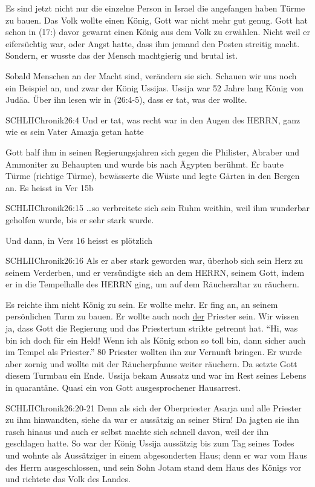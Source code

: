 \documentclass[fontsize=16pt]{mybib}
\begin{document}
\begin{otsblock}

    Es sind jetzt nicht nur die einzelne Person in Israel die angefangen haben Türme zu bauen. Das Volk wollte einen König, Gott war nicht mehr gut genug. Gott hat schon in (17:) davor gewarnt einen König aus dem Volk zu erwählen. Nicht weil er eifersüchtig war, oder Angst hatte, dass ihm jemand den Posten streitig macht. Sondern, er wusste das der Mensch machtgierig und brutal ist.
    
    Sobald Menschen an der Macht sind, verändern sie sich. Schauen wir uns noch ein Beispiel an, und zwar der König Ussijas. Ussija war 52 Jahre lang König von Judäa. Über ihn lesen wir in (26:4-5), dass er tat, was der \herr{} wollte. 
    \begin{bibelbox}{SCHL}{IIChronik}{26:4}
        Und er tat, was recht war in den Augen des HERRN, ganz wie es sein Vater Amazja getan hatte
    \end{bibelbox} 
    Gott half ihm in seinen Regierungsjahren sich gegen die Philister, Abraber und Ammoniter zu Behaupten und wurde bis nach Ägypten berühmt. Er baute Türme (richtige Türme), bewässerte die Wüste und legte Gärten in den Bergen an. Es heisst in Ver 15b
    \begin{bibelbox}{SCHL}{IIChronik}{26:15}
        \dots so verbreitete sich sein Ruhm weithin, weil ihm wunderbar geholfen wurde, bis er sehr stark wurde.
    \end{bibelbox} 

    Und dann, in Vers 16 heisst es plötzlich
    \begin{bibelbox}{SCHL}{IIChronik}{26:16}
        Als er aber stark geworden war, überhob sich sein Herz zu seinem Verderben, und er versündigte sich an dem HERRN, seinem Gott, indem er in die Tempelhalle des HERRN ging, um auf dem Räucheraltar zu räuchern.
    \end{bibelbox} 
    Es reichte ihm nicht König zu sein. Er wollte mehr. Er fing an, an seinem persönlichen Turm zu bauen. Er wollte auch noch \underline{der} Priester sein. Wir wissen ja, dass Gott die Regierung und das Priestertum strikte getrennt hat. 
    \enquote{Hi, was bin ich doch für ein Held! Wenn ich als König schon so toll bin, dann sicher auch im Tempel als Priester.} 80 Priester wollten ihn zur Vernunft bringen. Er wurde aber zornig und wollte mit der Räucherpfanne weiter räuchern. Da setzte Gott diesem Turmbau ein Ende. Ussija bekam Aussatz und war im Rest seines Lebens in quarantäne. Quasi ein von Gott ausgesprochener Hausarrest.
    \begin{bibelbox}{SCHL}{IIChronik}{26:20-21}
        Denn als sich der Oberpriester Asarja und alle Priester zu ihm hinwandten, siehe da war er aussätzig an seiner Stirn! Da jagten sie ihn rasch hinaus und auch er selbst machte sich schnell davon, weil der \herr{} ihn geschlagen hatte.
        So war der König Ussija aussätzig bis zum Tag seines Todes und wohnte als Aussätziger in einem abgesonderten Haus; denn er war vom Haus des Herrn ausgeschlossen, und sein Sohn Jotam stand dem Haus des Königs vor und richtete das Volk des Landes.
    \end{bibelbox}
\end{otsblock}
\end{document}
